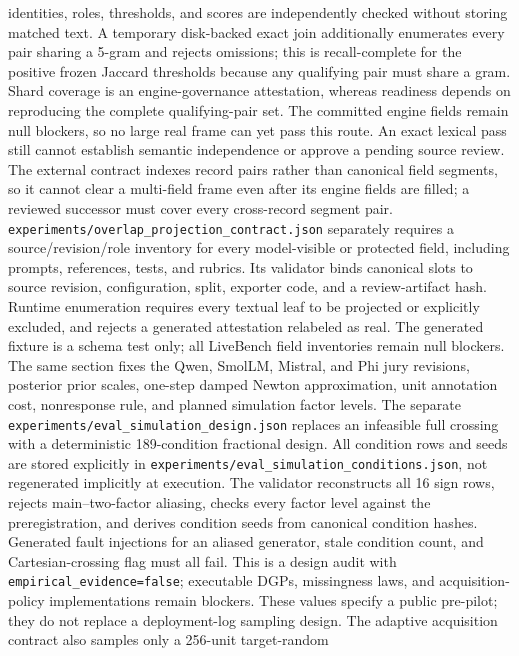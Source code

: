 \documentclass{article}
\begin{document}
identities, roles, thresholds, and scores are independently checked without
storing matched text. A temporary disk-backed exact join additionally
enumerates every pair sharing a 5-gram and rejects omissions; this is
recall-complete for the positive frozen Jaccard thresholds because any
qualifying pair must share a gram. Shard coverage is an engine-governance
attestation, whereas readiness depends on reproducing the complete
qualifying-pair set. The committed engine fields remain null blockers, so no
large real frame can yet pass this route. An exact lexical pass still cannot
establish semantic independence or approve a pending source review.
The external contract indexes record pairs rather than canonical field
segments, so it cannot clear a multi-field frame even after its engine fields
are filled; a reviewed successor must cover every cross-record segment pair.
\texttt{experiments/overlap\_projection\_contract.json} separately requires a
source/revision/role inventory for every model-visible or protected field,
including prompts, references, tests, and rubrics. Its validator binds
canonical slots to source revision, configuration, split, exporter code, and a
review-artifact hash. Runtime enumeration requires every textual leaf to be
projected or explicitly excluded, and rejects a generated attestation
relabeled as real. The generated fixture is a schema
test only; all LiveBench field inventories remain null blockers.
The same section fixes the Qwen, SmolLM, Mistral, and Phi jury revisions,
posterior prior scales, one-step damped Newton approximation, unit annotation
cost, nonresponse rule, and planned simulation factor levels. The separate
\texttt{experiments/eval\_simulation\_design.json} replaces an infeasible full
crossing with a deterministic 189-condition fractional design. All condition
rows and seeds are stored explicitly in
\texttt{experiments/eval\_simulation\_conditions.json}, not regenerated
implicitly at execution. The validator
reconstructs all 16 sign rows, rejects main--two-factor aliasing, checks every
factor level against the preregistration, and derives condition seeds from
canonical condition hashes. Generated fault injections for an aliased
generator, stale condition count, and Cartesian-crossing flag must all fail.
This is a design audit with \texttt{empirical\_evidence=false}; executable
DGPs, missingness laws, and acquisition-policy implementations remain
blockers. These values specify a public pre-pilot; they do not replace a
deployment-log sampling design.
The adaptive acquisition contract also samples only a 256-unit target-random
\end{document}
